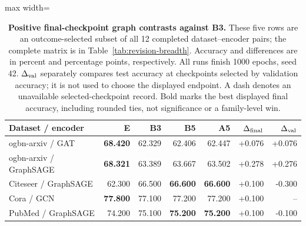 \begin{table}[t]
\centering
\caption{\textbf{Positive final-checkpoint graph contrasts against B3.} These five rows are an outcome-selected subset of all 12 completed dataset--encoder pairs; the complete matrix is in Table~\ref{tab:revision-breadth}. Accuracy and differences are in percent and percentage points, respectively. All runs finish 1000 epochs, seed 42. $\Delta_{\rm val}$ separately compares test accuracy at checkpoints selected by validation accuracy; it is not used to choose the displayed endpoint. A dash denotes an unavailable selected-checkpoint record. Bold marks the best displayed final accuracy, including rounded ties, not significance or a family-level win.}
\label{tab:positive-graph-contrasts}
\footnotesize\setlength{\tabcolsep}{6pt}\renewcommand{\arraystretch}{1.12}
\begin{adjustbox}{max width=\linewidth}
\begin{tabular}{lrrrrrr}
\toprule
Dataset / encoder & E & B3 & B5 & A5 & $\Delta_{\rm final}$ & $\Delta_{\rm val}$ \\
\midrule
ogbn-arxiv / GAT & \textbf{68.420} & 62.329 & \cellcolor{oursbg}62.406 & 62.447 & +0.076 & +0.076 \\
ogbn-arxiv / GraphSAGE & \textbf{68.321} & 63.389 & \cellcolor{oursbg}63.667 & 63.502 & +0.278 & +0.276 \\
Citeseer / GraphSAGE & 62.300 & 66.500 & \cellcolor{oursbg}\textbf{66.600} & \textbf{66.600} & +0.100 & -0.300 \\
Cora / GCN & \textbf{77.800} & 77.100 & \cellcolor{oursbg}77.200 & 77.200 & +0.100 & -- \\
PubMed / GraphSAGE & 74.200 & 75.100 & \cellcolor{oursbg}\textbf{75.200} & \textbf{75.200} & +0.100 & -0.100 \\
\bottomrule
\end{tabular}
\end{adjustbox}
\end{table}
